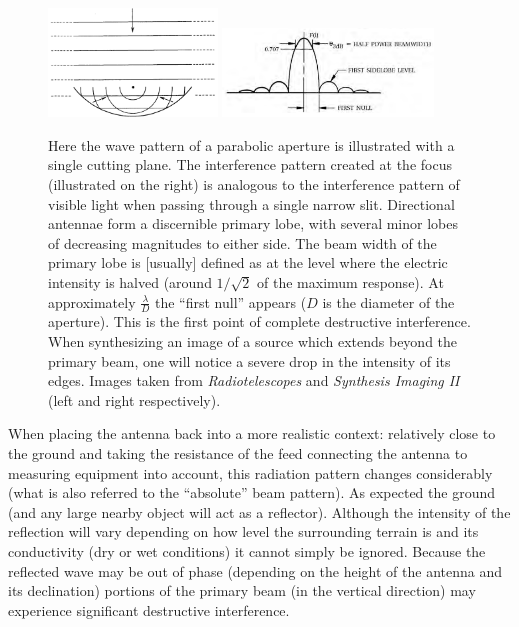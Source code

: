\documentclass[a4paper,10pt]{report}
\begin{document}
\begin{figure}[ht]
 \begin{mdframed}
  \centering
  \includegraphics[width=0.4\textwidth]{images/diffraction_pattern.png}
  \includegraphics[width=0.5\textwidth]{images/radiation_pattern.png}
  \caption[Collection of electromagnetic wave energy and response]{Here the wave pattern of a parabolic aperture is 
  illustrated with a single cutting plane. The interference pattern created at the focus (illustrated on the right) is analogous to the interference pattern 
  of visible light when passing through a single narrow slit. Directional antennae form a discernible primary lobe, with several minor lobes of decreasing magnitudes to
  either side. The beam width of the primary lobe is [usually] defined as at the level where the electric intensity is halved (around $1/\sqrt{2}$ of the maximum response).
  At approximately $\frac{\lambda}{D}$ the ``first null'' appears ($D$ is the diameter of the aperture). This is the first point of complete destructive interference. When synthesizing
  an image  of a source which extends beyond the primary beam, one will notice a severe drop in the intensity of its edges. Images taken from \textit{Radiotelescopes} \cite{christiansenradiotelescopes} 
  and \textit{Synthesis Imaging II} \cite{taylor1999synthesis} (left and right respectively).}
  \label{diffraction_pattern}
 \end{mdframed}
\end{figure}

When placing the antenna back into a more realistic context: relatively close to the ground and taking the resistance of the feed connecting the antenna
to measuring equipment into account, this radiation pattern changes considerably (what is also referred to the ``absolute'' beam pattern).
As expected the ground (and any large nearby object will act as a reflector). Although the intensity of the reflection will vary depending
on how level the surrounding terrain is and its conductivity (dry or wet conditions) it cannot simply be ignored. Because the reflected wave may
be out of phase (depending on the height of the antenna and its declination) portions of the primary beam (in the vertical direction) 
may experience significant destructive interference.
\end{document}
